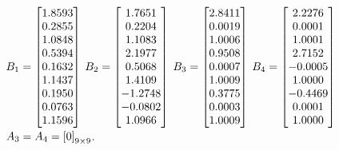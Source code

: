 \begin{table}
{ $B_1=\left[\begin{matrix}1.8593\\
    0.2855\\
    1.0848\\
    0.5394\\
    0.1632\\
    1.1437\\
    0.1950\\
    0.0763\\
    1.1596\end{matrix}\right]$
$B_2=\left[\begin{matrix}1.7651\\
    0.2204\\
    1.1083\\
    2.1977\\
    0.5068\\
    1.4109\\
   -1.2748\\
   -0.0802\\
    1.0966\end{matrix}\right]$
$B_3=\left[\begin{matrix}2.8411\\
    0.0019\\
    1.0006\\
    0.9508\\
    0.0007\\
    1.0009\\
    0.3775\\
    0.0003\\
    1.0009\end{matrix}\right]$    
$B_4=\left[\begin{matrix}2.2276\\
    0.0001\\
    1.0001\\
    2.7152\\
   -0.0005\\
    1.0000\\
   -0.4469\\
    0.0001\\
    1.0000\\
\end{matrix}\right]$
~~$A_3=A_4=\left[0\right]_{9\times 9}$.
}
\end{table}
%
